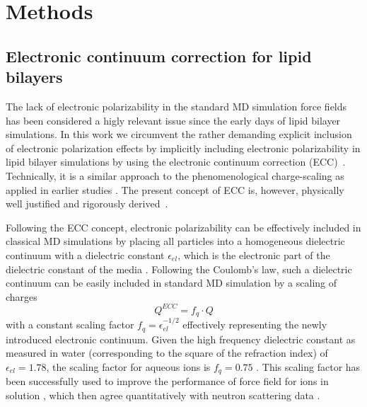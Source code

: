 \documentclass[aip,jcp,twocolumn]{revtex4}
\begin{document}
\section{Methods}

\subsection{Electronic continuum correction for lipid bilayers}\label{section:ecc}
The lack of electronic polarizability in the standard MD simulation
force fields has been considered a higly relevant issue since the early days of
lipid bilayer simulations.
In this work we circumvent the rather demanding explicit inclusion
of electronic polarization effects \cite{lucas12,chowdhary13} by implicitly including
electronic polarizability in lipid
bilayer simulations by using the electronic continuum correction
(ECC)~\cite{leontyev11}. 
Technically, it is a similar approach to the phenomenological charge-scaling as applied in 
earlier studies \cite{jonsson86,egberts94}.
The present concept of ECC is, however, 
physically well justified and rigorously derived~\cite{leontyev09, leontyev10, leontyev11}.


Following the ECC concept, electronic
polarizability can be effectively included in classical MD simulations by
placing all particles into a homogeneous dielectric continuum 
with a dielectric constant $\epsilon _{el}$, 
which is the electronic part of the dielectric constant of 
the media \cite{leontyev11}. 
Following the Coulomb's law, such a dielectric continuum can be easily included in standard MD simulation by
a scaling of charges 
\begin{equation}
  Q^{ECC} = f_q \cdot Q
\end{equation}
with a constant scaling factor $f_q = \epsilon _{el} ^{-1/2}$ 
effectively representing the newly introduced electronic continuum. 
Given the  high frequency dielectric constant as measured in water (corresponding to the square of the refraction index) of  $\epsilon _{el} = 1.78$,  
the scaling factor for aqueous ions is $f_q = 0.75$ \cite{some_orig_source, leontyev11}. This scaling factor has been
successfully used to improve the performance of force field for ions in solution \cite{kohagen14,kohagen16,??},
which then agree quantitatively with neutron scattering data \cite{kohagen14,kohagen16, Pluharova2014}. 
\end{document}
